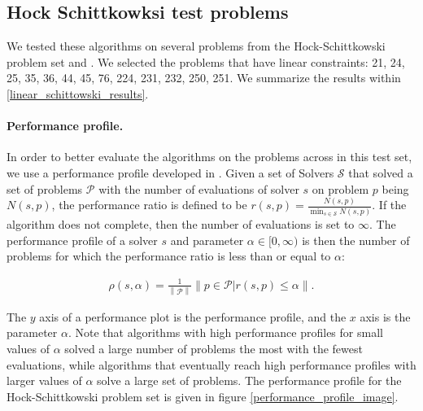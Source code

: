 \subsection{Hock Schittkowksi test problems}


We tested these algorithms on several problems from the Hock-Schittkowski problem set \cite{Schittkowski1981MoreTE} and \cite{Hock1980}.
We selected the problems that have linear constraints: 21, 24, 25, 35, 36, 44, 45, 76, 224, 231, 232, 250, 251.
We summarize the results within \cref{linear_schittowski_results}.


\paragraph*{Performance profile.}
\label{performance_profile}
In order to better evaluate the algorithms on the problems across in this test set, we use a performance profile developed in \cite{More:2009:BDO:1654367.1654371}.
Given a set of Solvers $\mathcal S$ that solved a set of problems $\mathcal P$ with the number of evaluations of solver $s$ on problem $p$ being $N(s, p)$, the performance ratio is defined to be $r(s, p) = \frac{N(s, p)}{\min_{s \in \mathcal S} N(s, p)}$.
If the algorithm does not complete, then the number of evaluations is set to $\infty$.
The performance profile of a solver $s$ and parameter $\alpha \in [0, \infty)$ is then the number of problems for which the performance ratio is less than or equal to $\alpha$: 

\begin{align}
\rho(s, \alpha) = \frac 1 {\left\|\mathcal P \right\|} \left\|p \in \mathcal P | r(s, p) \le \alpha\right\|.
\end{align}

The $y$ axis of a performance plot is the performance profile, and the $x$ axis is the parameter $\alpha$.
Note that algorithms with high performance profiles for small values of $\alpha$ solved a large number of problems the most with the fewest evaluations, while algorithms that eventually reach high performance profiles with larger values of $\alpha$ solve a large set of problems.
The performance profile for the Hock-Schittkowski problem set is given in figure \cref{performance_profile_image}.

